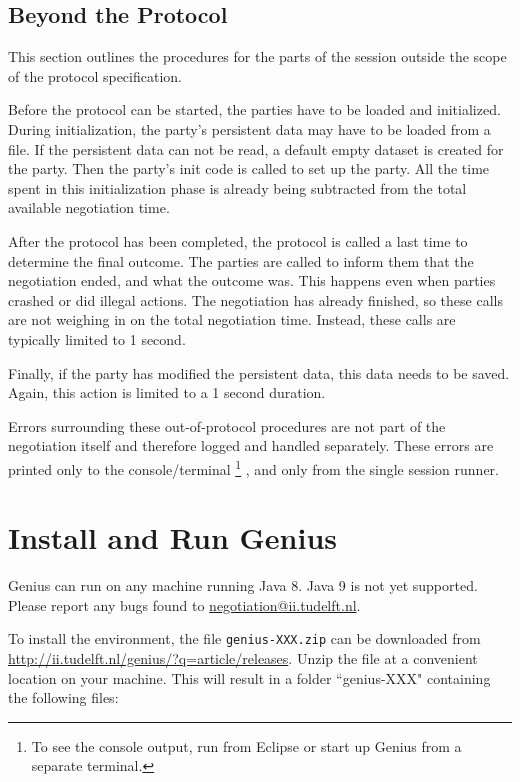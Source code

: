 \documentclass[]{article}
\newcommand\Genius{{\sc Genius}}
\begin{document}
\subsection{Beyond the Protocol}
This section outlines the procedures for the parts of the session outside the scope of the protocol specification.

Before the protocol can be started, the parties have to be loaded and initialized. During initialization, the party's persistent data may have to be loaded from a file. If the persistent data can not be read, a default empty dataset is created for the party. Then the party's init code is called to set up the party. All the time spent in this initialization phase is already being subtracted from the total available negotiation time.

After the protocol has been completed, the protocol is called a last time to determine the final outcome. 
The parties are called to inform them that the negotiation ended, and what the outcome was. This happens even when parties crashed or did illegal actions. The negotiation has already finished, so these calls are not weighing in on the total negotiation time. Instead, these calls are typically limited to 1 second. 

Finally, if the party has modified the persistent data, this data needs to be saved. Again, this action is limited to a 1 second duration.

Errors surrounding these out-of-protocol procedures are not part of the negotiation itself and therefore logged and handled separately. These errors are printed only to the console/terminal \footnote{To see the console output, run from Eclipse or start up Genius from a separate terminal. }
, and only from the single session runner.


\section{Install and Run {\Genius} }
{\Genius}  can run on any machine running Java 8. Java 9 is not yet supported. Please report any bugs found to \url{negotiation@ii.tudelft.nl}.

To install the environment, the file \texttt{genius-XXX.zip} can be downloaded from \url{http://ii.tudelft.nl/genius/?q=article/releases}. Unzip the file at a convenient location on your machine. This will result in a folder ``genius-XXX" containing the following files:
\end{document}
